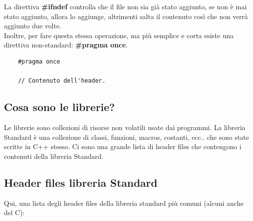 \textsf{\small La direttiva \textbf{\#ifndef} controlla che il file non sia già stato aggiunto, se non è mai stato aggiunto, allora lo aggiunge, altrimenti salta il contenuto così che non verrà aggiunto due volte.} \\

\textsf{\small Inoltre, per fare questa stessa operazione, ma più semplice e corta esiste una direttiva non-standard: \textbf{\#pragma once}. } 

\begin{lstlisting}
	#pragma once
	
	// Contenuto dell'header.
\end{lstlisting}

\subsection{Cosa sono le librerie?}

\textsf{\small Le librerie sono collezioni di risorse non volatili usate dai programmi. La libreria Standard è una collezione di classi, funzioni, macros, costanti, ecc.. che sono state scritte in C++ stesso. Ci sono una grande lista di header files che contengono i contenuti della libreria Standard.} \\

\subsection{Header files libreria Standard}

\textsf{\small Qui, una lista degli header files della libreria standard più comuni (alcuni anche del C): } \break


